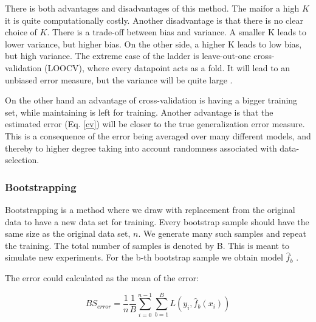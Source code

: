 There is both advantages and disadvantages of this method. The maifor a high $K$ it is quite computationally costly. Another disadvantage is that there is no clear choice of $K$. There is a trade-off between bias and variance. A smaller K leads to lower variance, but higher bias. On the other side, a higher K leads to low bias, but high variance. The extreme case of the ladder is leave-out-one cross-validation (LOOCV), where every datapoint acts as a fold. It will lead to an unbiased error measure, but the variance will be quite large \citep[p. 242]{hastie}.

On the other hand an advantage of cross-validation is having a bigger training set, while maintaining  is left for training. Another advantage is that the estimated error (Eq. \ref{cv}) will be closer to the true generalization error measure. This is a consequence of the error being averaged over many different models, and thereby to higher degree taking into account randomness associated with data-selection. 


\subsubsection{Bootstrapping}
Bootstrapping is a method where we draw with replacement from the original data to have a new data set for training. Every bootstrap sample should have the same size as the original data set, $n$. We generate many such samples and repeat the training. The total number of samples is denoted by B. This is meant to simulate new experiments. 
For the b-th bootstrap sample we obtain model $\hat{f}_b$ \citep[p. 249]{hastie}.

The error could calculated as the mean of the error:

\begin{equation}
    BS_{error} = \frac{1}{n}\frac{1}{B}\sum_{i=0}^{n-1}\sum_{b=1}^{B} L\left(y_i, \hat{f}_b(x_i)\right)
\end{equation}





